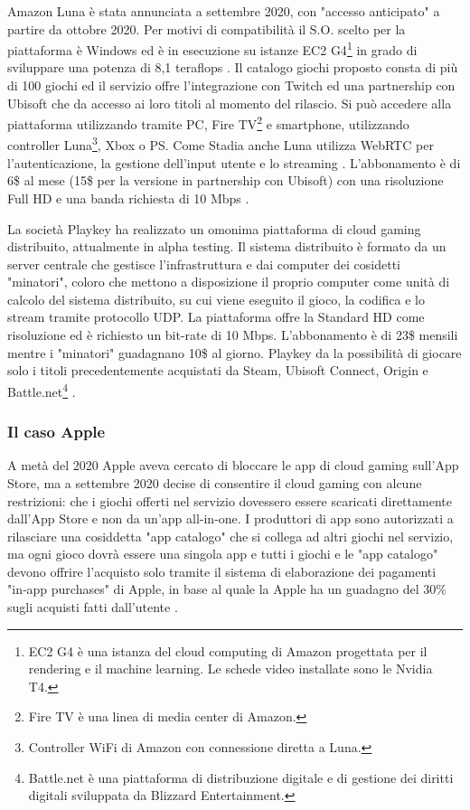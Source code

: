 Amazon Luna è stata annunciata a settembre 2020, con "accesso anticipato" a partire da ottobre 2020. Per motivi di compatibilità il S.O. scelto per la piattaforma è Windows ed è in esecuzione su istanze EC2 G4\footnote{EC2 G4 è una istanza del cloud computing di Amazon progettata per il rendering e il machine learning. Le schede video installate sono le Nvidia T4.} in grado di sviluppare una potenza di 8,1 teraflops \parencite{Amazon_Luna_GPU}. Il catalogo giochi proposto consta di più di 100 giochi ed il servizio offre l'integrazione con Twitch ed una partnership con Ubisoft che da accesso ai loro titoli al momento del rilascio. Si può accedere alla piattaforma utilizzando tramite PC, Fire TV\footnote{Fire TV è una linea di media center di Amazon.} e smartphone, utilizzando controller Luna\footnote{Controller WiFi di Amazon con connessione diretta a Luna.}, Xbox o PS. Come Stadia anche Luna utilizza WebRTC per l'autenticazione, la gestione dell'input utente e lo streaming \parencite{Amazon_Luna_WebRTC}. L'abbonamento è di 6\$ al mese (15\$ per la versione in partnership con Ubisoft) con una risoluzione Full HD e una banda richiesta di 10 Mbps \parencite{Amazon_Luna}.

La società Playkey ha realizzato un omonima piattaforma di cloud gaming distribuito, attualmente in alpha testing. Il sistema distribuito è formato da un server centrale che gestisce l'infrastruttura e dai computer dei cosidetti "minatori", coloro che mettono a disposizione il proprio computer come unità di calcolo del sistema distribuito, su cui viene eseguito il gioco, la codifica e lo stream tramite protocollo UDP. La piattaforma offre la Standard HD come risoluzione ed è richiesto un bit-rate di 10 Mbps. L'abbonamento è di 23\$ mensili mentre i "minatori" guadagnano 10\$ al giorno. Playkey da la possibilità di giocare solo i titoli precedentemente acquistati da Steam, Ubisoft Connect, Origin e Battle.net\footnote{Battle.net è una piattaforma di distribuzione digitale e di gestione dei diritti digitali sviluppata da Blizzard Entertainment.} \parencite{Playkey}.



\subsubsection{Il caso Apple}
A metà del 2020 Apple aveva cercato di bloccare le app di cloud gaming sull'App Store, ma a settembre 2020 decise di consentire il cloud gaming con alcune restrizioni: che i giochi offerti nel servizio dovessero essere scaricati direttamente dall'App Store e non da un'app all-in-one. I produttori di app sono autorizzati a rilasciare una cosiddetta "app catalogo" che si collega ad altri giochi nel servizio, ma ogni gioco dovrà essere una singola app e tutti i giochi e le "app catalogo" devono offrire l'acquisto solo tramite il sistema di elaborazione dei pagamenti "in‑app purchases" di Apple, in base al quale la Apple ha un guadagno del 30\% sugli acquisti fatti dall'utente \parencite{Apple_controversy}.



